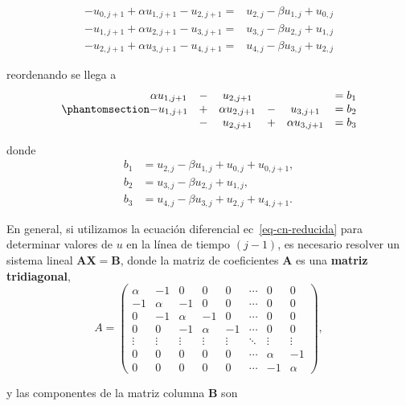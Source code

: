 \documentclass[
  spanish,
  us-letterpaper,
  DIV=11,
  numbers=noendperiod]{scrreprt}
\theoremstyle{plain}
\theoremstyle{definition}
\theoremstyle{remark}
\begin{document}
\[
\begin{split}
-u_{0,j+1} + \alpha u_{1,j+1} - u_{2,j+1} =& u_{2,j} - \beta u_{1,j} + u_{0,j} \\
-u_{1,j+1} + \alpha u_{2,j+1} - u_{3,j+1} =& u_{3,j} - \beta u_{2,j} + u_{1,j} \\
-u_{2,j+1} + \alpha u_{3,j+1} - u_{4,j+1} =& u_{4,j} - \beta u_{3,j} + u_{2,j}
\end{split}
\]

reordenando se llega a
\begin{equation}\phantomsection\label{eq-cn-matrix}{
\begin{matrix}
\alpha u_{1,j+1} &-& u_{2,j+1}&& &= b_1 \\
-u_{1,j+1} &+& \alpha u_{2,j+1} &-& u_{3,j+1} &= b_2 \\
&-&u_{2,j+1} &+& \alpha u_{3,j+1} &= b_3
\end{matrix}
}\end{equation}

donde \begin{align*}
b_1 &= u_{2,j} - \beta u_{1,j} + u_{0,j} + u_{0,j+1}, \\
b_2 &= u_{3,j} - \beta u_{2,j} + u_{1,j}, \\
b_3 &= u_{4,j} - \beta u_{3,j} + u_{2,j} + u_{4,j+1}.
\end{align*}

En general, si utilizamos la ecuación diferencial
ec~\ref{eq-cn-reducida} para determinar valores de \(u\) en la línea de
tiempo \((j -1)\), es necesario resolver un sistema lineal
\(\mathbf{AX=B}\), donde la matriz de coeficientes \(\mathbf{A}\) es una
\textbf{matriz tridiagonal}, \[
A = 
\begin{pmatrix}
\alpha & -1    & 0      & 0      & 0      & \cdots & 0 & 0      \\
-1     & \alpha & -1     & 0      & 0      & \cdots & 0 & 0      \\
0      & -1     & \alpha & -1     & 0      & \cdots & 0 & 0      \\
0      & 0      & -1     & \alpha & -1     & \cdots & 0 & 0      \\
\vdots & \vdots & \vdots & \vdots & \vdots & \ddots & \vdots & \vdots \\
0      & 0      & 0      & 0      & 0      & \cdots & \alpha & -1 \\
0      & 0      & 0      & 0      & 0      & \cdots & -1     & \alpha
\end{pmatrix},
\]

y las componentes de la matriz columna \(\mathbf{B}\) son
\end{document}
